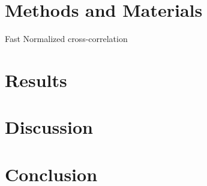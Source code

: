 



\section{Methods and Materials}



Fast Normalized cross-correlation \citet{yoo_fast_2009}


\section{Results}








\section{Discussion}

\section{Conclusion}